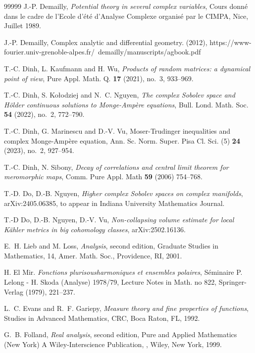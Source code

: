 \documentclass{amsart}
\theoremstyle{definition}
\numberwithin{thm}{section}
\numberwithin{equation}{section}
\renewcommand{\[}{\begin{equation}}
\renewcommand{\]}{\end{equation}}
\begin{document}
\begin{thebibliography}{99999}
 J.-P. Demailly, {\it Potential theory in several complex variables}, Cours donn\'e dans le cadre de l'Ecole d'\'et\'e d'Analyse Complexe organis\'e par le CIMPA, Nice, Juillet 1989.


 J.-P. Demailly, Complex analytic and differential geometry. (2012), https://www-fourier.univ-grenoble-alpes.fr/~demailly/manuscripts/agbook.pdf


T.-C. Dinh, L. Kaufmann and H. Wu, {\it Products of random matrices: a dynamical point of view}, Pure Appl. Math. Q. {\bf 17} (2021), no.~3, 933--969.

T.-C. Dinh, S. Ko\l odziej and N.~C. Nguyen, {\it The complex Sobolev space and H\"older continuous solutions to Monge-Amp\`ere equations}, Bull. Lond. Math. Soc. {\bf 54} (2022), no.~2, 772--790.

 T.-C. Dinh, G. Marinescu and D.-V. Vu, Moser-Trudinger inequalities and complex Monge-Amp\`ere equation, Ann. Sc. Norm. Super. Pisa Cl. Sci. (5) {\bf 24} (2023), no.~2, 927--954.


 T.-C. Dinh, N. Sibony, {\it Decay of correlations and central limit theorem for meromorphic maps}, 
Comm. Pure Appl. Math {\bf 59} (2006) 754--768.

 T.-D. Do, D.-B. Nguyen, {\it 
Higher complex Sobolev spaces on complex manifolds}, arXiv:2405.06385, to appear  in Indiana University Mathematics Journal.

 T.-D Do, D.-B. Nguyen, D.-V. Vu, {\it 
Non-collapsing volume estimate for local K\"ahler  metrics in big cohomology classes}, arXiv:2502.16136.

E.~H. Lieb and M. Loss, {\it Analysis}, second edition, 
Graduate Studies in Mathematics, 14, Amer. Math. Soc., Providence, RI, 2001.

 H. El Mir. {\it Fonctions plurisousharmoniques et ensembles polaires}, S\'eminaire P. Lelong - H. Skoda (Analyse) 1978/79, Lecture Notes in Math. no 822, Springer-Verlag (1979), 221--237.


L.~C. Evans and R.~F. Gariepy, {\it Measure theory and fine properties of functions}, Studies in Advanced Mathematics, CRC, Boca Raton, FL, 1992.

G.~B. Folland, {\it Real analysis}, second edition, 
Pure and Applied Mathematics (New York) A Wiley-Interscience Publication, , Wiley, New York, 1999. 


\end{thebibliography}
\end{document}
